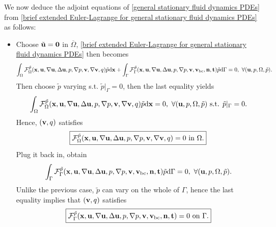 \documentclass[oneside,11pt]{book}
\numberwithin{equation}{section}
\begin{document}
\begin{itemize}[leftmargin=0in]
    We now deduce the adjoint equations of \eqref{general stationary fluid dynamics PDEs} from \eqref{brief extended Euler-Lagrange for general stationary fluid dynamics PDEs} as follows:
    \begin{itemize}
        \item Choose $\tilde{\bf u} = {\bf 0}$ in $\overline{\Omega}$, \eqref{brief extended Euler-Lagrange for general stationary fluid dynamics PDEs} then becomes
        \begin{align*}
            \int_\Omega \mathcal{F}_\Omega^{\tilde{p}}({\bf x},{\bf u},\nabla{\bf u},\Delta{\bf u},p,\nabla p,{\bf v},\nabla{\bf v},q)\tilde{p}{\rm d}{\bf x} + \int_\Gamma \mathcal{F}_\Gamma^{\tilde{p}}({\bf x},{\bf u},\nabla{\bf u},\Delta{\bf u},p,\nabla p,{\bf v},{\bf v}_{\rm bc},{\bf n},{\bf t})\tilde{p}{\rm d}\Gamma = 0,\ \forall({\bf u},p,\Omega,\tilde{p}).
        \end{align*}
        Then choose $\tilde{p}$ varying s.t. $\tilde{p}|_\Gamma = 0$, then the last equality yields
        \begin{align*}
            \int_\Omega \mathcal{F}_\Omega^{\tilde{p}}({\bf x},{\bf u},\nabla{\bf u},\Delta{\bf u},p,\nabla p,{\bf v},\nabla{\bf v},q)\tilde{p}{\rm d}{\bf x} = 0,\ \forall({\bf u},p,\Omega,\tilde{p}) \mbox{ s.t. } \tilde{p}|_\Gamma = 0.
        \end{align*}
        Hence, $({\bf v},q)$ satisfies
        \begin{align}
            \label{extended domain integrand variation p}
            \boxed{\mathcal{F}_\Omega^{\tilde{p}}({\bf x},{\bf u},\nabla{\bf u},\Delta{\bf u},p,\nabla p,{\bf v},\nabla{\bf v},q) = 0 \mbox{ in } \Omega.}
        \end{align}
        Plug it back in, obtain
        \begin{align*}
            \int_\Gamma \mathcal{F}_\Gamma^{\tilde{p}}({\bf x},{\bf u},\nabla{\bf u},\Delta{\bf u},p,\nabla p,{\bf v},{\bf v}_{\rm bc},{\bf n},{\bf t})\tilde{p}{\rm d}\Gamma = 0,\ \forall({\bf u},p,\Omega,\tilde{p}).
        \end{align*}
        Unlike the previous case, $\tilde{p}$ can vary on the whole of $\Gamma$, hence the last equality implies that $({\bf v},q)$ satisfies
        \begin{align}
            \label{extended boundary integrand variation p}
            \boxed{\mathcal{F}_\Gamma^{\tilde{p}}({\bf x},{\bf u},\nabla{\bf u},\Delta{\bf u},p,\nabla p,{\bf v},{\bf v}_{\rm bc},{\bf n},{\bf t}) = 0 \mbox{ on } \Gamma.}
        \end{align}

\end{itemize}
\end{itemize}
\end{document}
